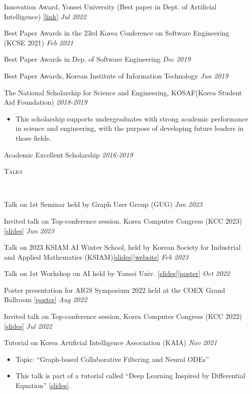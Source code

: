 \documentclass[10pt]{article}
\newenvironment{changemargin}[2]{
  \begin{list}{}{
    \setlength{\topsep}{0pt}
    \setlength{\leftmargin}{#1}
    \setlength{\rightmargin}{#2}
    \setlength{\listparindent}{\parindent}
    \setlength{\itemindent}{\parindent}
    \setlength{\parsep}{\parskip}
  }
  \item[]}{\end{list}
}
\newcommand{\lineover}{
	\begin{changemargin}{-0.05in}{-0.05in}
		\vspace*{-8pt}
		\hrulefill \\
		\vspace*{-2pt}
	\end{changemargin}
}
\newcommand{\header}[1]{
	\begin{changemargin}{-0.5in}{-0.5in}
		\scshape{#1}\\
  	\lineover
	\end{changemargin}
}
\newcommand{\award}[2]{
	{#1} \hfill \emph{#2}\\ \medskip
}
\newenvironment{body} {
	\vspace*{-16pt}
	\begin{changemargin}{-0.25in}{-0.5in}
  }
	{\end{changemargin}
}
\begin{document}
\begin{body}
	\vspace{14pt}

\award{Innovation Award, Yonsei University (Best paper in Dept. of Artificial Intelligence) \href{https://www.yonsei.ac.kr/ocx/news.jsp?mode=view&ar_seq=20220708141917269049&sr_volume=632&list_mode=list&sr_site=S&pager.offset=0&sr_cates=29}{[link]}}{Jul 2022}
\award{Best Paper Awards in the 23rd Korea Conference on Software Engineering (KCSE 2021)}{Feb 2021}
\award{Best Paper Awards in Dep. of Software Engineering}{Dec 2019}
\award{Best Paper Awards, Korean Institute of Information Technology}{Jun 2019}
\award{The National Scholarship for Science and Engineering, KOSAF(Korea Student Aid Foundation)}{2018-2019}
    \begin{itemize} \itemsep -0pt  %
      \item This scholarship supports undergraduates with strong academic performance in science and engineering, with the purpose of developing future leaders in those fields.
  	\end{itemize}
\award{Academic Excellent Scholarship}{2016-2019}
\end{body}

\medskip

\header{Talks}

\begin{body}
	\vspace{14pt}
\award{Talk on 1st Seminar held by Graph User Group (GUG)}{Jun 2023}
\award{Invited talk on Top-conference session, Korea Computer Congress (KCC 2023) [\href{https://www.dropbox.com/s/34h6pmr7ftdiuzr/BSPM-KCC23.pptx?dl=0}{slides}]}{Jun 2023}
\award{Talk on 2023 KSIAM AI Winter School, held by Korean Society for Industrial and Applied Mathematics (KSIAM)[\href{https://www.dropbox.com/s/p4sd5h40hcuxcob/KSIAM23-Tutorial-ODE-RecSys.pdf?dl=0}{slides}][\href{https://ksiam.org/Conference/ConferenceView.asp?AC=3&CODE=CD20230101&CpPage=\#CONF}{website}]}{Feb 2023}
\award{Talk on 1st Workshop on AI held by Yonsei Univ. [\href{https://www.dropbox.com/s/9au5xx13qa2l529/AAAI22_workshop.pdf?dl=0}{slides}][\href{https://www.dropbox.com/s/pibzd51d76zy907/AAAI22-Yonsei_AI_Workshop.pdf?dl=0}{poster}]}{Oct 2022}
\award{Poster presentation for AIGS Symposium 2022 held at the COEX Grand Ballroom [\href{https://www.dropbox.com/s/gfjsizak9s4cn9o/AAAI22-AIGS.pdf?dl=0}{poster}]}{Aug 2022}
\award{Invited talk on Top-conference session,  Korea Computer Congress (KCC 2022) [\href{https://www.dropbox.com/s/22d9d92ns8uv9qw/AAAI22_KCC22.pdf?dl=0}{slides}]}{Jul 2022}
\award{Tutorial on Korea Artificial Intelligence Association (KAIA)}{Nov 2021}
	\begin{itemize} \itemsep -0pt  %
        \item Topic: ``Graph-based Collaborative Filtering and Neural ODEs''
		\item This talk is part of a tutorial called ``Deep Learning Inspired by Differential Equation'' [\href{https://www.dropbox.com/s/1xn8xhd6llmhblz/%5BKAIA2021%5DTutorial-LT-OCF.pdf?dl=0}{slides}].
  	\end{itemize}
\end{body}
\end{document}
